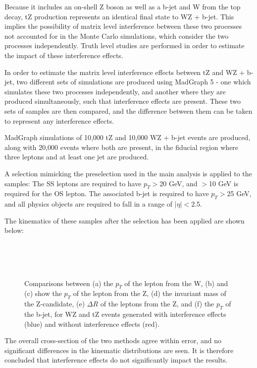 Because it includes an on-shell Z boson as well as a b-jet and W from the top decay, tZ production represents an identical final state  to WZ + b-jet. This implies the possibility of matrix level interference between these two processes not accounted for in the Monte Carlo simulations, which consider the two processes independently. Truth level studies are performed in order to estimate the impact of these interference effects.    

In order to estimate the matrix level interference effects between tZ and WZ + b-jet, two different sets of simulations are produced using MadGraph 5 \cite{Madgraph} - one which simulates these two processes independently, and another where they are  produced simultaneously, such that interference effects are present. These two sets of samples are then compared, and the difference between them can be taken to represent any interference effects.

MadGraph simulations of 10,000 tZ and 10,000 WZ + b-jet events are produced, along with 20,000 events where both are present, in the fiducial region where three leptons and at least one jet are produced.  

A selection mimicking the preselection used in the main analysis is applied to the samples: The SS leptons are required to have $p_T>$20 GeV, and $>$10 GeV is required for the OS lepton. The associated b-jet is required to have $p_T>$25 GeV, and all physics objects are required to fall in a range of $|\eta|<$2.5. 

The kinematics of these samples after the selection has been applied are shown below:

\begin{figure}[H]
    \\
    \\
    \\
    \caption{Comparisons between (a) the $p_T$ of the lepton from the W, (b) and (c) show the $p_T$ of the lepton from the Z, (d)  the invariant mass of the Z-candidate, (e) $\Delta R$ of the leptons from the Z, and (f) the $p_T$ of the b-jet, for WZ and tZ events generated with interference effects (blue) and without interference effects (red).}
\end{figure}

The overall cross-section of the two methods agree within error, and no significant differences in the kinematic distributions are seen. It is therefore concluded that interference effects do not significantly impact the results.
